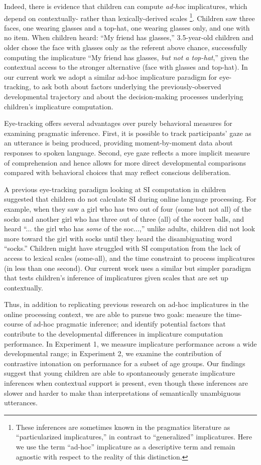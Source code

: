 \documentclass[10pt,letterpaper]{article}
\begin{document}
Indeed, there is evidence that children can compute \emph{ad-hoc} implicatures, which depend on contextually- rather than lexically-derived scales \cite{stillerLLD}\footnote{These inferences are sometimes known in the pragmatics literature as ``particularized implicatures,'' in contrast to ``generalized'' implicatures. Here we use the term ``ad-hoc'' implicature as a descriptive term and remain agnostic with respect to the reality of this distinction.}. Children saw three faces, one wearing glasses and a top-hat, one wearing glasses only, and one with no item. When children heard: ``My friend has glasses,'' 3.5-year-old children and older chose the face with glasses only as the referent above chance, successfully computing the implicature ``My friend has glasses, \emph{but not a top-hat},'' given the contextual access to the stronger alternative (face with glasses and top-hat). In our current work we adopt a similar ad-hoc implicature paradigm for eye-tracking, to ask both about factors underlying the previously-observed developmental trajectory and about the decision-making processes underlying children's implicature computation. 

Eye-tracking offers several advantages over purely behavioral measures for examining pragmatic inference. First, it is possible to track participants' gaze as an utterance is being produced, providing moment-by-moment data about responses to spoken language. Second, eye gaze reflects a more implicit measure of comprehension and hence allows for more direct developmental comparisons compared with behavioral choices that may reflect conscious deliberation. 

A previous eye-tracking paradigm looking at SI computation in children \cite{huang2009semantic} suggested that children do not calculate SI during online language processing. For example, when they saw a girl who has two out of four (some but not all) of the socks and another girl who has three out of three (all) of the soccer balls, and heard ``... the girl who has \emph{some} of the soc...,'' unlike adults, children did not look more toward the girl with socks until they heard the disambiguating word ``socks.'' Children might have struggled with SI computation from the lack of access to lexical scales (some-all), and the time constraint to process implicatures (in less than one second). Our current work uses a similar but simpler paradigm that tests children's inference of implicatures given scales that are set up contextually.

Thus, in addition to replicating previous research on ad-hoc implicatures in the online processing context, we are able to pursue two goals: measure the time-course of ad-hoc pragmatic inference; and identify potential factors that contribute to the developmental differences in implicature computation performance. In Experiment 1, we measure implicature performance across a wide developmental range; in Experiment 2, we examine the contribution of contrastive intonation on performance for a subset of age groups. Our findings suggest that young children are able to spontaneously generate implicature inferences when contextual support is present, even though these inferences are slower and harder to make than interpretations of semantically unambiguous utterances.
\end{document}
